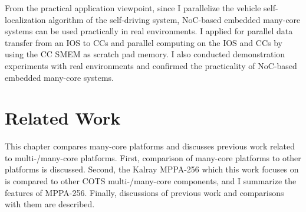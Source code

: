 From the practical application viewpoint, since I parallelize the vehicle self-localization algorithm of the self-driving system, NoC-based embedded many-core systems can be used practically in real environments.
I applied for parallel data transfer from an IOS to CCs and parallel computing on the IOS and CCs by using the CC SMEM as scratch pad memory.    
I also conducted demonstration experiments with real environments and confirmed the practicality of NoC-based embedded many-core systems.

\chapter{Related Work}
\label{chap:related_work}
This chapter compares many-core platforms and discusses previous work related to multi-/many-core platforms.
First, comparison of many-core platforms to other platforms is discussed.
Second, the Kalray MPPA-256 which this work focuses on is compared to other COTS multi-/many-core components, and I summarize the features of MPPA-256.
Finally, discussions of previous work and comparisons with them are described.


